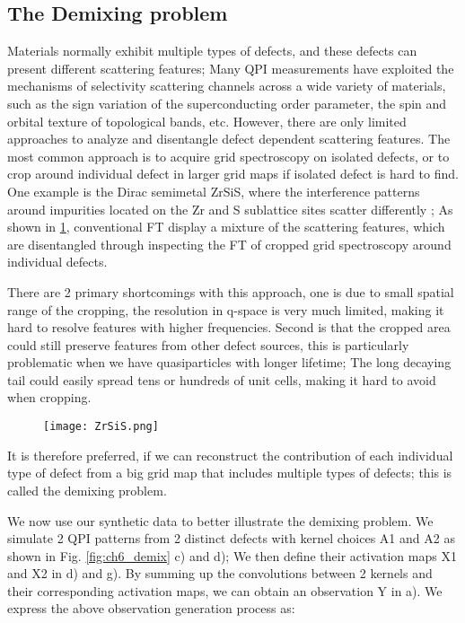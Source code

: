 \subsection{The Demixing problem}
Materials normally exhibit multiple types of defects, and these defects can present different scattering features; Many QPI measurements have exploited the mechanisms of selectivity scattering channels across a wide variety of materials, such as the sign variation of the superconducting order parameter, the spin and orbital texture of topological bands, etc. However, there are only limited approaches to analyze and disentangle defect dependent scattering features. The most common approach is to acquire grid spectroscopy on isolated defects, or to crop around individual defect in larger grid maps if isolated defect is hard to find. One example is the Dirac semimetal ZrSiS, where the interference patterns around impurities located on the Zr and S sublattice sites scatter differently \cite{butler et al}; As shown in \ref{fig:ch6_ZrSiS}, conventional \ac{FT} display a mixture of the scattering features, which are disentangled through inspecting the \ac{FT} of cropped grid spectroscopy around individual defects. 

There are 2 primary shortcomings with this approach, one is due to small spatial range of the cropping, the resolution in q-space is very much limited, making it hard to resolve features with higher frequencies. Second is that the cropped area could still preserve features from other defect sources, this is particularly problematic when we have quasiparticles with longer lifetime; The long decaying tail could easily spread tens or hundreds of unit cells, making it hard to avoid when cropping. 

\begin{figure}
	\texttt{[image: ZrSiS.png]} 
	\centering
	\caption{}
	\label{fig:ch6_ZrSiS}
\end{figure}

It is therefore preferred, if we can reconstruct the contribution of each individual type of defect from a big grid map that includes multiple types of defects; this is called the demixing problem.  

We now use our synthetic data to better illustrate the demixing problem. We simulate 2 \ac{QPI} patterns from 2 distinct defects with kernel choices A1 and A2 as shown in Fig. \ref{fig:ch6_demix} c) and d); We then define their activation maps X1 and X2 in d) and g). By summing up the convolutions between 2 kernels and their corresponding activation maps, we can obtain an observation Y in a). We express the above observation generation process as:

